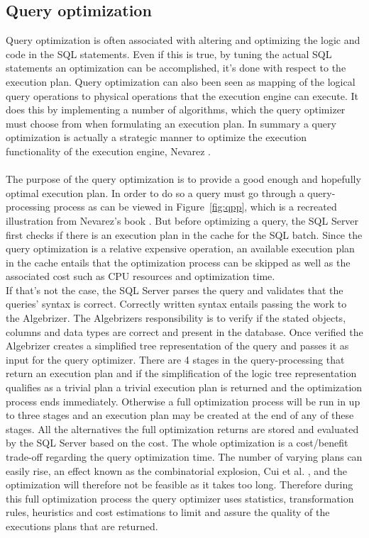 \documentclass{cslthse-msc}
\begin{document}
\subsection{Query optimization}\label{sec:qopt}
Query optimization is often associated with altering and optimizing the logic and code in the SQL statements. Even if this is true, by tuning the actual SQL statements an optimization can be accomplished, it's done with respect to the execution plan. Query optimization can also been seen as mapping of the logical query operations to physical operations that the execution engine can execute. It does this by implementing a number of algorithms, which the query optimizer must choose from when formulating an execution plan. In summary a query optimization is actually a strategic manner to optimize the execution functionality of the execution engine, Nevarez \cite{Nevarez}. \\\\ 
The purpose of the query optimization is to provide a good enough and hopefully optimal execution plan. In order to do so a query must go through a query-processing process as can be viewed in Figure~\ref{fig:qpp}, which is a recreated illustration from Nevarez's book \cite{Nevarez}. But before optimizing a query, the SQL Server first checks if there is an execution plan in the cache for the SQL batch. Since the query optimization is a relative expensive operation, an available execution plan in the cache entails that the optimization process can be skipped as well as the associated cost such as CPU resources and optimization time.\\ If that's not the case, the SQL Server parses the query and validates that the queries' syntax is correct. Correctly written syntax entails passing the work to the Algebrizer. The Algebrizers responsibility is to verify if the stated objects, columns and data types are correct and present in the database. Once verified the Algebrizer creates a simplified tree representation of the query and passes it as input for the query optimizer. There are 4 stages in the query-processing that return an execution plan and if the simplification of the logic tree representation qualifies as a trivial plan a trivial execution plan is returned and the optimization process ends immediately. Otherwise a full optimization process will be run in up to three stages and an execution plan may be created at the end of any of these stages. All the alternatives the full optimization returns are stored and evaluated by the SQL Server based on the cost. The whole optimization is a cost/benefit trade-off regarding the query optimization time. The number of varying plans can easily rise, an effect known as the combinatorial explosion, Cui et al. \cite{combo}, and the optimization will therefore not be feasible as it takes too long. Therefore during this full optimization process the query optimizer uses statistics, transformation rules, heuristics and cost estimations to limit and assure the quality of the executions plans that are returned.
\end{document}
